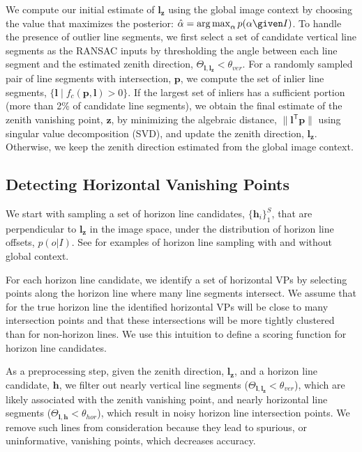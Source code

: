 We compute our initial estimate of $\mathbf{l}_{\mathbf{z}}$ using the global
image context by choosing the value that maximizes the posterior:
$\hat{\alpha} = \operatorname*{arg\,max}_\alpha p(\alpha \given I)$.
%
To handle the presence of outlier line segments, we first select a set
of candidate vertical line segments as the RANSAC inputs by
thresholding the angle between each line segment and the estimated
zenith direction, $\Theta_{\mathbf{l},\mathbf{l}_{\mathbf{z}}} < \theta_{ver}$.  For a
randomly sampled pair of line segments with intersection, $\mathbf{p}$, we
compute the set of inlier line segments, $\{\mathbf{l} \mid f_c(\mathbf{p}, \mathbf{l})
> 0\}$.  If the largest set of inliers has a sufficient portion (more
than 2\% of candidate line segments), we obtain the final estimate of
the zenith vanishing point, $\mathbf{z}$, by minimizing the algebraic
distance, $\|\mathbf{l}^\mathsf{T} \mathbf{p}\|$ using singular value decomposition
(SVD), and update the zenith direction, $\mathbf{l}_{\mathbf{z}}$. Otherwise, we
keep the zenith direction estimated from the global image context.


\subsection{Detecting Horizontal Vanishing Points}
\label{sec:horizondetection}

We start with sampling a set of horizon line candidates,
$\{\mathbf{h}_i\}_1^S$, that are perpendicular to $\mathbf{l}_{\mathbf{z}}$ in the image
space, under the distribution of horizon line offsets, $p(o | I)$.
See  for examples of horizon line sampling with
and without global context.

For each horizon line candidate, we identify a set of horizontal VPs
by selecting points along the horizon line where many line segments
intersect. We assume that for the true horizon line the identified
horizontal VPs will be close to many intersection points and that
these intersections will be more tightly clustered than for
non-horizon lines. We use this intuition to define a scoring function
for horizon line candidates.

As a preprocessing step, given the zenith direction, $\mathbf{l}_{\mathbf{z}}$,
and a horizon line candidate, $\mathbf{h}$, we filter out nearly vertical
line segments ($\Theta_{\mathbf{l},\mathbf{l}_{\mathbf{z}}} < \theta_{ver}$), which are
likely associated with the zenith vanishing point, and nearly
horizontal line segments ($\Theta_{\mathbf{l},\mathbf{h}} < \theta_{hor}$), which
result in noisy horizon line intersection points.  We remove such
lines from consideration because they lead to spurious, or
uninformative, vanishing points, which decreases accuracy.

